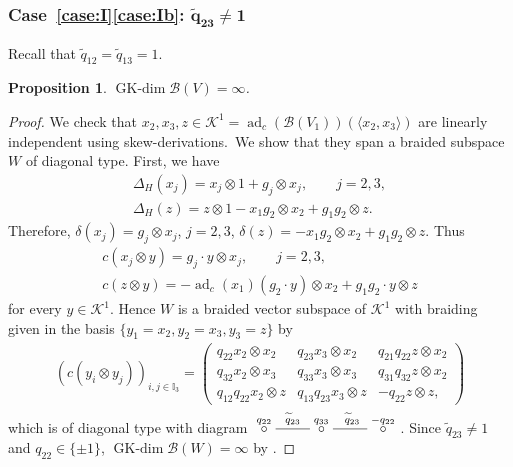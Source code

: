 \documentclass[pdftex]{sigma}
\numberwithin{equation}{section}
\newtheorem{Proposition}[Theorem]{Proposition}
 { \theoremstyle{definition}
\newtheorem{Definition}[Theorem]{Definition}
\newtheorem{Note}[Theorem]{Note}
\newtheorem{Example}[Theorem]{Example}
\newtheorem{Remark}[Theorem]{Remark} }
\newcommand{\adc}{\operatorname{ad}_c}
\newcommand{\GK}{\operatorname{GK-dim}}
\newcommand{\toba}{\mathscr B}
\newcommand{\K}{{\mathcal{K}}}
\newcommand{\I}{{\mathbb I}}
\begin{document}
\subsubsection[Case (I)(b): widetilde\{q\}\_\{23\} neq 1]{Case~\ref{case:I}\ref{case:Ib}: $\boldsymbol{\widetilde{q}_{23} \neq 1}$}
Recall that $\widetilde{q}_{12}= \widetilde{q}_{13}=1$.

\begin{Proposition}\label{prop:pale-2pts-Ib} $\GK \toba(V) = \infty$.
\end{Proposition}

\begin{proof}
We check that $x_2, x_3, z\in \K^1 = \adc(\toba(V_1))(\langle x_2, x_3 \rangle)$ are linearly independent using skew-derivations.\
We show that they span a braided subspace $W$ of diagonal type. First, we have
\begin{gather*}
\Delta_{H}(x_j) = x_j \otimes 1 + g_j \otimes x_j ,\qquad j =2,3, \\
\Delta_{H}(z) = z \otimes 1 - x_1 g_2 \otimes x_2 + g_1g_2 \otimes z.
\end{gather*}
Therefore,
$\delta(x_j) = g_j \otimes x_j$, $j =2,3$,
$\delta(z) = -x_1 g_2 \otimes x_2 + g_1g_2 \otimes z$.
Thus
\begin{gather*}
c(x_j\otimes y) = g_j \cdot y \otimes x_j,\qquad j =2,3, \\
c(z\otimes y) = -\adc(x_1)(g_2 \cdot y) \otimes x_2 + g_1g_2 \cdot y \otimes z
\end{gather*}
for every $y \in \K^1$.
Hence $W$ is a braided vector subspace of $\K^1$ with braiding given in the basis $\{y_1 = x_2, y_2= x_3, y_3 = z \}$ by
\begin{align*}
(c(y_i \otimes y_j))_{i,j\in \I_{3}}=
\begin{pmatrix}
q_{22} x_2 \otimes x_2 & q_{23} x_3 \otimes x_2 & q_{21}q_{22} z \otimes x_2 \\
q_{32} x_2 \otimes x_3 & q_{33} x_3 \otimes x_3 & q_{31}q_{32} z \otimes x_2 \\
q_{12}q_{22} x_2 \otimes z & q_{13}q_{23} x_3 \otimes z & -q_{22} z \otimes z,
\end{pmatrix}
\end{align*}
which is of diagonal type with diagram
$\xymatrix{
\overset{q_{22}}{\circ} \ar @{-}[r]^{\widetilde{q}_{23}} & \overset{q_{33}}{\circ} \ar @{-}[r]^{\widetilde{q}_{23}} &
\overset{-q_{22}}{\circ}}$.
Since $\widetilde{q}_{23} \neq 1$ and $q_{22}\in \{\pm 1\}$, $\GK \toba(W) = \infty$ by \cite[Lemma~2.3.7]{AAH-triang}.
\end{proof}
\end{document}
